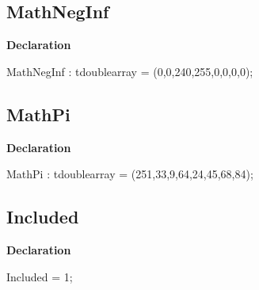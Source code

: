 \documentclass{report}
\begin{document}
\subsection*{MathNegInf}
\begin{list}{}{
\setlength{\itemindent}{0cm}
\setlength{\listparindent}{0cm}
\setlength{\leftmargin}{\evensidemargin}
\addtolength{\leftmargin}{\tmplength}
\settowidth{\labelsep}{X}
\addtolength{\leftmargin}{\labelsep}
\setlength{\labelwidth}{\tmplength}
}
\begin{flushleft}
\item[\textbf{Declaration}\hfill]
\begin{ttfamily}
MathNegInf : tdoublearray = (0,0,240,255,0,0,0,0);\end{ttfamily}


\end{flushleft}
\end{list}
\subsection*{MathPi}
\begin{list}{}{
\setlength{\itemindent}{0cm}
\setlength{\listparindent}{0cm}
\setlength{\leftmargin}{\evensidemargin}
\addtolength{\leftmargin}{\tmplength}
\settowidth{\labelsep}{X}
\addtolength{\leftmargin}{\labelsep}
\setlength{\labelwidth}{\tmplength}
}
\begin{flushleft}
\item[\textbf{Declaration}\hfill]
\begin{ttfamily}
MathPi : tdoublearray =  (251,33,9,64,24,45,68,84);\end{ttfamily}


\end{flushleft}
\end{list}
\subsection*{Included}
\begin{list}{}{
\setlength{\itemindent}{0cm}
\setlength{\listparindent}{0cm}
\setlength{\leftmargin}{\evensidemargin}
\addtolength{\leftmargin}{\tmplength}
\settowidth{\labelsep}{X}
\addtolength{\leftmargin}{\labelsep}
\setlength{\labelwidth}{\tmplength}
}
\begin{flushleft}
\item[\textbf{Declaration}\hfill]
\begin{ttfamily}
Included = 1;\end{ttfamily}


\end{flushleft}
\end{list}
\end{document}
